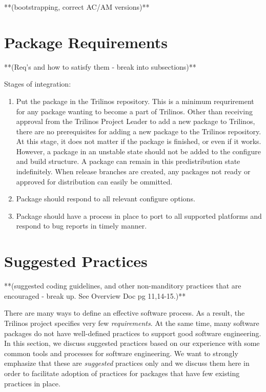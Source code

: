 \documentclass[12pt,relax]{SANDreport}
\begin{document}
**(bootstrapping, correct AC/AM versions)**



\section{Package Requirements}
	**(Req's and how to satisfy them - break into subsections)**

Stages of integration:
\begin{enumerate}
\item Put the package in the Trilinos repository.
This is a minimum requrirement for any package wanting to become a part of 
Trilinos.  Other than receiving approval from the Trilinos Project Leader to 
add a new package to Trilinos, there are no prerequisites for adding a new 
package to the Trilinos repository.  At this stage, it does not matter if the 
package is finished, or even if it works.  However, a package in an unstable 
state should not be added to the configure and build structure.  A package 
can remain in this predistribution state indefinitely.  When release branches 
are created, any packages not ready or approved for distribution can easily be 
ommitted.

\item Package should respond to all relevant configure options.
\item Package should have a process in place to port to all supported 
platforms and respond to bug reports in timely manner.
\end{enumerate}


\section{Suggested Practices}
	**(suggested coding guidelines, and other non-manditory practices that are encouraged - break up.  See Overview Doc pg 11,14-15.)**

There are many ways to define an effective software process.  As a result, the 
Trilinos project specifies very few {\it requirements}.  At the same time, 
many software packages do not have well-defined practices to support good 
software engineering.  In this section, we discuss suggested practices based 
on our experience with some common tools and processes for software 
engineering.  We want to strongly emphasize that these are {\it suggested} 
practices only and we discuss them here in order to facilitate adoption of 
practices for packages that have few existing practices in place.
\end{document}
